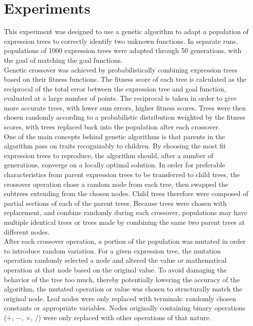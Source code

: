 
\section{Experiments}
\label{sec:expts}

This experiment was designed to use a genetic algorithm to adapt a population of expression trees to correctly identify two unknown functions.  In separate runs, populations of 1000 expression trees were adapted through 50 generations, with the goal of matching the goal functions.  \\

Genetic crossover was achieved by probabilistically combining expression trees based on their fitness functions.  The fitness score of each tree is calculated as the reciprocal of the total error between the expression tree and goal function, evaluated at a large number of points.  The reciprocal is taken in order to give more accurate trees, with lower sum errors, higher fitness scores.  Trees were then chosen randomly according to a probabilistic distribution weighted by the fitness scores, with trees replaced back into the population after each crossover.\\

One of the main concepts behind genetic algorithms is that parents in the algorithm pass on traits recognizably to children.  By choosing the most fit expression trees to reproduce, the algorithm should, after a number of generations, converge on a locally optimal solution. In order for preferable characteristics from parent expression trees to be transferred to child trees, the crossover operation chose a random node from each tree, then swapped the subtrees extending from the chosen nodes.  Child trees therefore were composed of partial sections of each of the parent trees.  Because trees were chosen with replacement, and combine randomly during each crossover, populations may have multiple identical trees or trees made by combining the same two parent trees at different nodes. \\

After each crossover operation, a portion of the population was mutated in order to introduce random variation. For a given expression tree, the mutation operation randomly selected a node and altered the value or mathematical operation at that node based on the original value.  To avoid damaging the behavior of the tree too much, thereby potentially lowering the accuracy of the algorithm, the mutated operation or value was chosen to structurally match the original node.  Leaf nodes were only replaced with terminals: randomly chosen constants or appropriate variables.  Nodes originally containing binary operations ($+$, $-$, $\times$, $/$) were only replaced with other operations of that nature. \\

